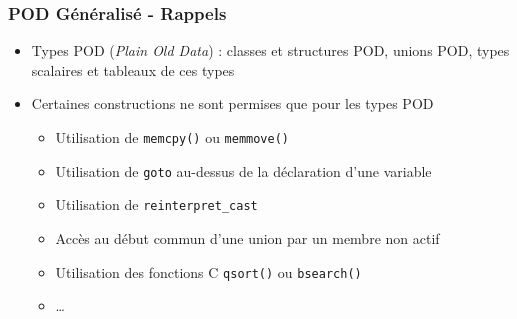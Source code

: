 \documentclass[C++.tex]{subfiles}
\begin{document}
\begin{frame}[fragile]
	\frametitle{POD Généralisé - Rappels}
	\begin{itemize}
		\item Types POD (\textit{Plain Old Data}) : classes et structures POD, unions POD, types scalaires et tableaux de ces types
		\item Certaines constructions ne sont permises que pour les types POD


		\begin{itemize}
			\item Utilisation de \lstinline|memcpy()| ou \lstinline|memmove()|
			\item Utilisation de \lstinline|goto| \og au-dessus\fg{} de la déclaration d'une variable


			\item Utilisation de \lstinline|reinterpret_cast|
			\item Accès au début commun d'une union par un membre non actif
			\item Utilisation des fonctions C \lstinline|qsort()| ou \lstinline|bsearch()|
			\item \ldots
		\end{itemize}
	\end{itemize}
\end{frame}
\end{document}
